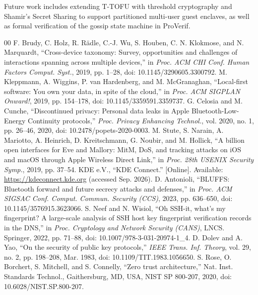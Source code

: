 \documentclass[conference,a4paper]{IEEEtran}
\begin{document}
Future work includes extending T-TOFU with threshold cryptography and Shamir's Secret Sharing to support partitioned multi-user guest enclaves, as well as formal verification of the gossip state machine in ProVerif.

\begin{thebibliography}{00}
 F. Brudy, C. Holz, R. R\"{a}dle, C.-J. Wu, S. Houben, C. N. Klokmose, and N. Marquardt, ``Cross-device taxonomy: Survey, opportunities and challenges of interactions spanning across multiple devices,'' in \textit{Proc. ACM CHI Conf. Human Factors Comput. Syst.}, 2019, pp. 1--28, doi: 10.1145/3290605.3300792.
 M. Kleppmann, A. Wiggins, P. van Hardenberg, and M. McGranaghan, ``Local-first software: You own your data, in spite of the cloud,'' in \textit{Proc. ACM SIGPLAN Onward!}, 2019, pp. 154--178, doi: 10.1145/3359591.3359737.
 G. Celosia and M. Cunche, ``Discontinued privacy: Personal data leaks in Apple Bluetooth-Low-Energy Continuity protocols,'' \textit{Proc. Privacy Enhancing Technol.}, vol. 2020, no. 1, pp. 26--46, 2020, doi: 10.2478/popets-2020-0003.
 M. Stute, S. Narain, A. Mariotto, A. Heinrich, D. Kreitschmann, G. Noubir, and M. Hollick, ``A billion open interfaces for Eve and Mallory: MitM, DoS, and tracking attacks on iOS and macOS through Apple Wireless Direct Link,'' in \textit{Proc. 28th USENIX Security Symp.}, 2019, pp. 37--54.
 KDE e.V., ``KDE Connect.'' [Online]. Available: \url{https://kdeconnect.kde.org} (accessed Sep. 2026).
 D. Antonioli, ``BLUFFS: Bluetooth forward and future secrecy attacks and defenses,'' in \textit{Proc. ACM SIGSAC Conf. Comput. Commun. Security (CCS)}, 2023, pp. 636--650, doi: 10.1145/3576915.3623066.
 S. Neef and N. Wisiol, ``Oh SSH-it, what's my fingerprint? A large-scale analysis of SSH host key fingerprint verification records in the DNS,'' in \textit{Proc. Cryptology and Network Security (CANS)}, LNCS. Springer, 2022, pp. 71--88, doi: 10.1007/978-3-031-20974-1\_4.
 D. Dolev and A. Yao, ``On the security of public key protocols,'' \textit{IEEE Trans. Inf. Theory}, vol. 29, no. 2, pp. 198--208, Mar. 1983, doi: 10.1109/TIT.1983.1056650.
 S. Rose, O. Borchert, S. Mitchell, and S. Connelly, ``Zero trust architecture,'' Nat. Inst. Standards Technol., Gaithersburg, MD, USA, NIST SP 800-207, 2020, doi: 10.6028/NIST.SP.800-207.

\end{thebibliography}
\end{document}

